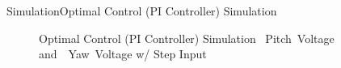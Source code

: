 \documentclass{beamer}
\begin{document}
\begin{frame}{Simulation}{Optimal Control (PI Controller) Simulation}
    \begin{figure}
      \centering
      \caption{Optimal Control (PI Controller) Simulation ~Pitch~Voltage and~~Yaw~Voltage w/ Step Input}
      \label{fig:LQR_PI_Sim_volt}
    \end{figure}
\end{frame}
\end{document}
